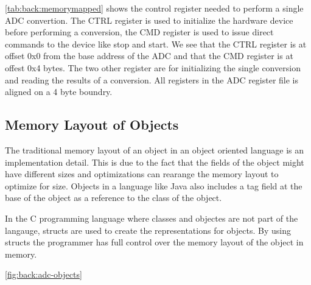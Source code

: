 \autoref{tab:back:memorymapped} shows the control register needed to perform a single ADC convertion.
The CTRL register is used to initialize the hardware device before performing a conversion, the CMD register is used to issue direct commands to the device like stop and start.
We see that the CTRL register is at offset 0x0 from the base address of the ADC and that the CMD register is at offest 0x4 bytes.
The two other register are for initializing the single conversion and reading the results of a conversion.
All registers in the ADC register file is aligned on a 4 byte boundry.

\subsection{Memory Layout of Objects}

The traditional memory layout of an object in an object oriented language is an implementation detail.
This is due to the fact that the fields of the object might have different sizes and optimizations can rearange the memory layout to optimize for size.
Objects in a language like Java also includes a tag field at the base of the object as a reference to the class of the object.

In the C programming language where classes and objectes are not part of the langauge, structs are used to create the representations for objects.
By using structs the programmer has full control over the memory layout of the object in memory.

\autoref{fig:back:adc-objects}

